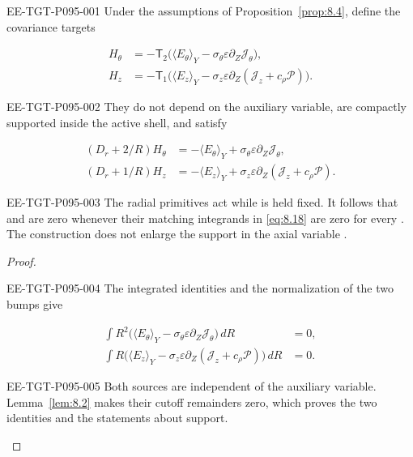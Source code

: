 %
\begin{corollary}\label{cor:8.5}
\begin{EESegment}{EE-TGT-P095-001}
Under the assumptions of Proposition~\ref{prop:8.4}, define the covariance targets
\end{EESegment}
\begin{equation}
\begin{aligned}
H_\theta&=-\mathsf T_2\bigl(\langle E_\theta\rangle_Y
  -\sigma_\theta\varepsilon\partial_Z\mathcal J_\theta\bigr),\\
H_z&=-\mathsf T_1\bigl(\langle E_z\rangle_Y
  -\sigma_z\varepsilon\partial_Z(\mathcal J_z+c_\rho\mathcal P)\bigr).
\end{aligned}
\tag{8.18}\label{eq:8.18}
\end{equation}
\begin{EESegment}{EE-TGT-P095-002}
They do not depend on the auxiliary variable, are compactly supported inside the active shell, and
satisfy
\end{EESegment}
\begin{align*}
(D_r+2/R)H_\theta&=-\langle E_\theta\rangle_Y
  +\sigma_\theta\varepsilon\partial_Z\mathcal J_\theta,\\
(D_r+1/R)H_z&=-\langle E_z\rangle_Y
  +\sigma_z\varepsilon\partial_Z(\mathcal J_z+c_\rho\mathcal P).
\end{align*}
\begin{EESegment}{EE-TGT-P095-003}
The radial primitives act while  is held fixed. It follows that
 and  are zero whenever their matching
integrands in \eqref{eq:8.18} are zero for every . The construction does
not enlarge the support in the axial variable .
\end{EESegment}
\end{corollary}

\begin{proof}
\begin{EESegment}{EE-TGT-P095-004}
The integrated identities and the normalization of the two bumps give
\end{EESegment}
\begin{align*}
\int R^2\bigl(\langle E_\theta\rangle_Y
  -\sigma_\theta\varepsilon\partial_Z\mathcal J_\theta\bigr)\,dR&=0,\\
\int R\bigl(\langle E_z\rangle_Y
  -\sigma_z\varepsilon\partial_Z(\mathcal J_z+c_\rho\mathcal P)\bigr)\,dR&=0.
\end{align*}
\begin{EESegment}{EE-TGT-P095-005}
Both sources are independent of the auxiliary variable. Lemma~\ref{lem:8.2} makes their cutoff
remainders zero, which proves the two identities and the statements about support.
\end{EESegment}
\end{proof}


